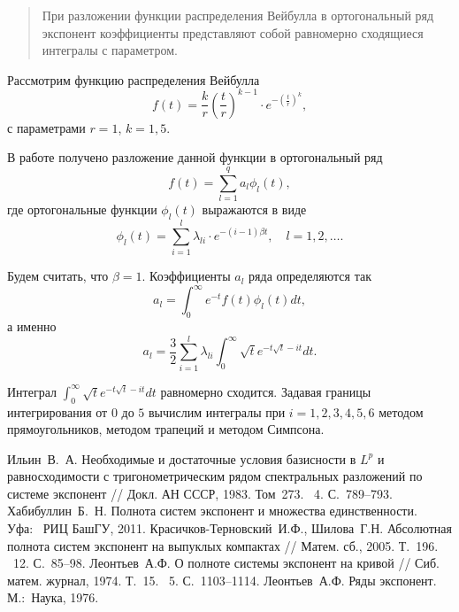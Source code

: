 \maketitle

\begin{abstract}
При разложении функции распределения Вейбулла в ортогональный ряд экспонент коэффициенты представляют собой равномерно сходящиеся интегралы с параметром.

\end{abstract}


Рассмотрим функцию распределения Вейбулла
$$
f(t)=\frac{k}{r}\left(\frac{t}{r}\right)^{k-1}\cdot e^{-\left(\frac{t}{r}\right)^k},
$$
с параметрами $r=1$, $k=1,5$.


В работе получено разложение данной функции в ортогональный ряд
$$
f(t)=\sum_{l=1}^q a_l\phi_l(t),
$$ 
где ортогональные функции $\phi_l(t)$ выражаются в виде
$$
\phi_l(t)=\sum_{i=1}^l\lambda_{li}\cdot e^{-(i-1)\beta t},\quad l=1,2,\ldots.
$$ 

Будем считать, что $\beta=1$.
Коэффициенты $a_l$ ряда определяются так
$$
a_l=\int_0^{\infty}e^{-t}f(t)\phi_l(t)dt,
$$
а именно
$$
a_l=\frac{3}{2}\sum_{i=1}^l\lambda_{li}\int_0^{\infty}\sqrt{t}e^{-t\sqrt{t}-it}dt.
$$

Интеграл $\int_0^{\infty}\sqrt{t}e^{-t\sqrt{t}-it}dt$ равномерно сходится. Задавая границы интегрирования от $0$ до $5$ вычислим интегралы при $i=1,2,3,4,5,6$ методом прямоугольников, методом трапеций и методом Симпсона.
%

\begin{thebibliography}{9} %
 Ильин~В.~А. Необходимые и достаточные условия базисности в $L^p$ и равносходимости с тригонометрическим рядом спектральных разложений по системе экспонент // Докл. АН СССР, 1983. Том~273. \textnumero~4. С.~789--793.
 Хабибуллин~Б.~Н. Полнота систем экспонент и множества единственности.  Уфа:~ РИЦ БашГУ, 2011.
	Красичков-Терновский~И.Ф., Шилова~Г.Н. Абсолютная полнота систем экспонент на выпуклых компактах // Матем. сб., 2005. Т.~196. \textnumero~12. С.~85--98.
	Леонтьев~А.Ф. О полноте системы экспонент на кривой // Сиб. матем. журнал, 1974. Т.~15. \textnumero~5. С.~1103--1114.
	Леонтьев~А.Ф. Ряды экспонент. М.:~Наука, 1976.
\end{thebibliography}




%
